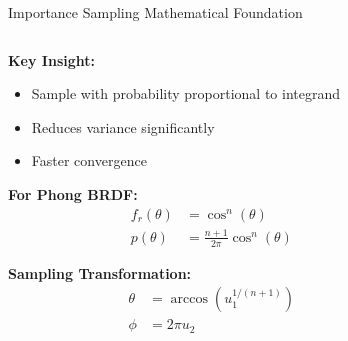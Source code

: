\documentclass[aspectratio=169]{beamer}
\begin{document}
\begin{frame}{Importance Sampling Mathematical Foundation}
    \begin{columns}
        \begin{column}{0.6\textwidth}
            \textbf{Key Insight:}
            \begin{itemize}
                \item<1-> Sample with probability proportional to integrand
                \item<2-> Reduces variance significantly
                \item<3-> Faster convergence
            \end{itemize}
            
            \vspace{0.5cm}
            \textbf{For Phong BRDF:}
            \begin{align}
                f_r(\theta) &= \cos^n(\theta) \\
                p(\theta) &= \frac{n+1}{2\pi} \cos^n(\theta)
            \end{align}
            
            \textbf{Sampling Transformation:}
            \begin{align}
                \theta &= \arccos(u_1^{1/(n+1)}) \\
                \phi &= 2\pi u_2
            \end{align}
        \end{column}
        \begin{column}{0.4\textwidth}
        \end{column}
    \end{columns}
\end{frame}
\end{document}
